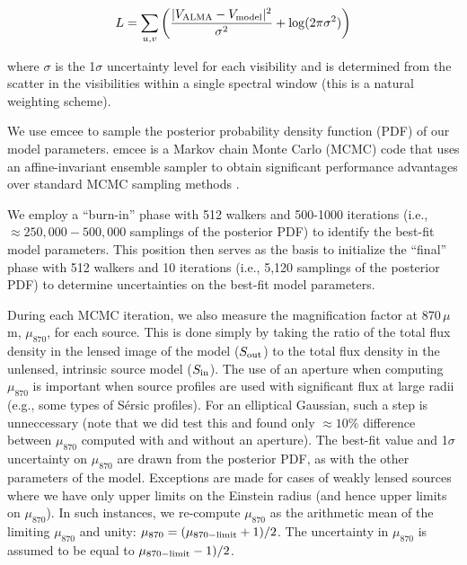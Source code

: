 \documentclass[iop]{emulateapj}
\begin{document}
\begin{equation}
    L = \sum_{u, v}\left( \frac{|V_{\rm ALMA} - V_{\rm
    model}|^2}{\sigma^2} + {\rm log}(2 \pi \sigma^2) \right)
\end{equation}

\noindent where $\sigma$ is the 1$\sigma$ uncertainty level for each
visibility and is determined from the scatter in the visibilities within a
single spectral window (this is a natural weighting scheme).  

We use {\sc emcee} \citep{Foreman-Mackey:2013yq} to sample the posterior
probability density function (PDF) of our model parameters.  {\sc emcee} is a
Markov chain Monte Carlo (MCMC) code that uses an affine-invariant ensemble
sampler to obtain significant performance advantages over standard MCMC
sampling methods \citep{goodmanweare}.  

We employ a ``burn-in'' phase with 512 walkers and 500-1000 iterations (i.e.,
$\approx 250,000-500,000$ samplings of the posterior PDF) to identify the
best-fit model parameters.  This position then serves as the basis to
initialize the ``final'' phase with 512 walkers and 10 iterations (i.e., 5,120
samplings of the posterior PDF) to determine uncertainties on the best-fit
model parameters.  

During each MCMC iteration, we also measure the magnification factor at
870$\,\mu$m, $\mu_{870}$, for each source.  This is done simply by taking the
ratio of the total flux density in the lensed image of the model ($S_{\rm
out}$) to the total flux density in the unlensed, intrinsic source model
($S_{\rm in}$).  The use of an aperture when computing $\mu_{870}$ is important
when source profiles are used with significant flux at large radii (e.g., some
types of S\'ersic profiles).  For an elliptical Gaussian, such a step is
unneccessary (note that we did test this and found only $\approx 10\%$
difference between $\mu_{870}$ computed with and without an aperture).  The
best-fit value and 1$\sigma$ uncertainty on $\mu_{870}$ are drawn from the
posterior PDF, as with the other parameters of the model.  Exceptions are made
for cases of weakly lensed sources where we have only upper limits on the
Einstein radius (and hence upper limits on $\mu_{870}$).  In such instances, we
re-compute $\mu_{870}$ as the arithmetic mean of the limiting $\mu_{870}$ and
unity: $\mu_{870} = (\mu_{\rm 870-limit} + 1) / 2$.  The uncertainty in
$\mu_{870}$ is assumed to be equal to $\mu_{\rm 870-limit} - 1) / 2$.
\end{document}
